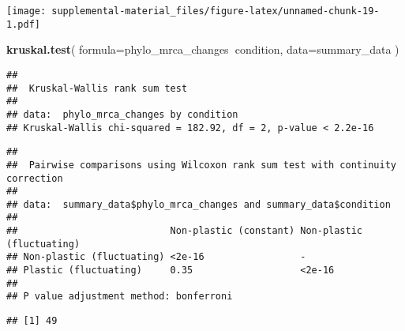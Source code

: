 \documentclass[]{book}
\newenvironment{Shaded}{\begin{snugshade}}{\end{snugshade}}
\newcommand{\DataTypeTok}[1]{\textcolor[rgb]{0.13,0.29,0.53}{#1}}
\newcommand{\KeywordTok}[1]{\textcolor[rgb]{0.13,0.29,0.53}{\textbf{#1}}}
\newcommand{\NormalTok}[1]{#1}
\newcommand{\OperatorTok}[1]{\textcolor[rgb]{0.81,0.36,0.00}{\textbf{#1}}}
\newcommand{\StringTok}[1]{\textcolor[rgb]{0.31,0.60,0.02}{#1}}
\begin{document}
\texttt{[image: supplemental-material\_files/figure-latex/unnamed-chunk-19-1.pdf]}

\begin{Shaded}
\begin{Highlighting}[]
\KeywordTok{kruskal.test}\NormalTok{(}
  \DataTypeTok{formula=}\NormalTok{phylo_mrca_changes}\OperatorTok{~}\NormalTok{condition,}
  \DataTypeTok{data=}\NormalTok{summary_data}
\NormalTok{)}
\end{Highlighting}
\end{Shaded}

\begin{verbatim}
## 
##  Kruskal-Wallis rank sum test
## 
## data:  phylo_mrca_changes by condition
## Kruskal-Wallis chi-squared = 182.92, df = 2, p-value < 2.2e-16
\end{verbatim}

\begin{Shaded}
\end{Shaded}

\begin{verbatim}
## 
##  Pairwise comparisons using Wilcoxon rank sum test with continuity correction 
## 
## data:  summary_data$phylo_mrca_changes and summary_data$condition 
## 
##                           Non-plastic (constant) Non-plastic (fluctuating)
## Non-plastic (fluctuating) <2e-16                 -                        
## Plastic (fluctuating)     0.35                   <2e-16                   
## 
## P value adjustment method: bonferroni
\end{verbatim}

\begin{Shaded}
\end{Shaded}

\begin{verbatim}
## [1] 49
\end{verbatim}
\end{document}
